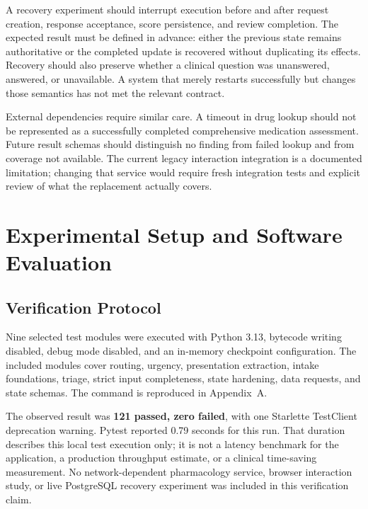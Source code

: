 \documentclass[conference]{IEEEtran}
\begin{document}
A recovery experiment should interrupt execution before and after request creation, response acceptance, score persistence, and review completion. The expected result must be defined in advance: either the previous state remains authoritative or the completed update is recovered without duplicating its effects. Recovery should also preserve whether a clinical question was unanswered, answered, or unavailable. A system that merely restarts successfully but changes those semantics has not met the relevant contract.

External dependencies require similar care. A timeout in drug lookup should not be represented as a successfully completed comprehensive medication assessment. Future result schemas should distinguish no finding from failed lookup and from coverage not available. The current legacy interaction integration is a documented limitation; changing that service would require fresh integration tests and explicit review of what the replacement actually covers.

\section{Experimental Setup and Software Evaluation}
\subsection{Verification Protocol}
Nine selected test modules were executed with Python 3.13, bytecode writing disabled, debug mode disabled, and an in-memory checkpoint configuration. The included modules cover routing, urgency, presentation extraction, intake foundations, triage, strict input completeness, state hardening, data requests, and state schemas. The command is reproduced in Appendix~A.

The observed result was \textbf{121 passed, zero failed}, with one Starlette TestClient deprecation warning. Pytest reported 0.79 seconds for this run. That duration describes this local test execution only; it is not a latency benchmark for the application, a production throughput estimate, or a clinical time-saving measurement. No network-dependent pharmacology service, browser interaction study, or live PostgreSQL recovery experiment was included in this verification claim.
\end{document}
